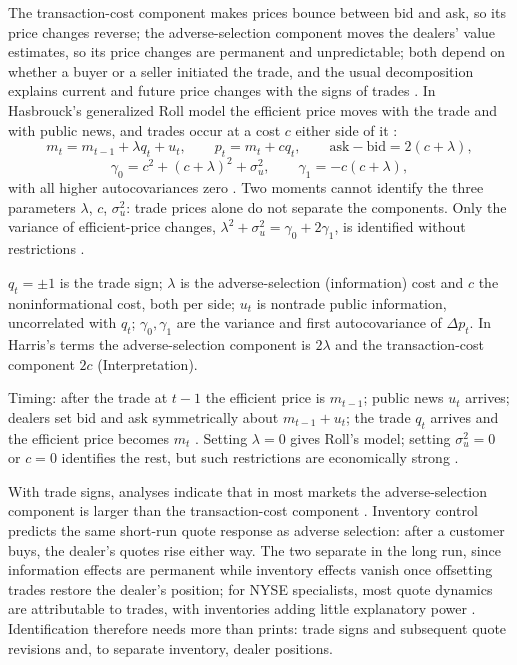 \begin{qfresult}\label{res:spread-component-identification}
 The transaction-cost component makes prices bounce between bid and ask, so its price changes reverse; the adverse-selection component moves the dealers' value estimates, so its price changes are permanent and unpredictable; both depend on whether a buyer or a seller initiated the trade, and the usual decomposition explains current and future price changes with the signs of trades \citep[chap.~``Bid/Ask Spreads'', pp.~299--300 and~302--303]{alpha-harris}. In Hasbrouck's generalized Roll model the efficient price moves with the trade and with public news, and trades occur at a cost $c$ either side of it \citep[sec.~8.2, eq.~(8.1), pp.~67--68]{s6-hasbrouck}:
\[ m_t=m_{t-1}+\lambda q_t+u_t, \qquad p_t=m_t+cq_t, \qquad \text{ask}-\text{bid}=2(c+\lambda), \]
\[ \gamma_0=c^2+(c+\lambda)^2+\sigma_u^2, \qquad \gamma_1=-c(c+\lambda), \]
with all higher autocovariances zero \citep[sec.~8.3, eq.~(8.3), p.~68]{s6-hasbrouck}. Two moments cannot identify the three parameters $\lambda$, $c$, $\sigma_u^2$: trade prices alone do not separate the components. Only the variance of efficient-price changes, $\lambda^2+\sigma_u^2=\gamma_0+2\gamma_1$, is identified without restrictions \citep[same sec., pp.~68--69]{s6-hasbrouck}.

 $q_t=\pm1$ is the trade sign; $\lambda$ is the adverse-selection (information) cost and $c$ the noninformational cost, both per side; $u_t$ is nontrade public information, uncorrelated with $q_t$; $\gamma_0,\gamma_1$ are the variance and first autocovariance of $\Delta p_t$. In Harris's terms the adverse-selection component is $2\lambda$ and the transaction-cost component $2c$ (Interpretation).

 Timing: after the trade at $t-1$ the efficient price is $m_{t-1}$; public news $u_t$ arrives; dealers set bid and ask symmetrically about $m_{t-1}+u_t$; the trade $q_t$ arrives and the efficient price becomes $m_t$ \citep[sec.~8.2, p.~68]{s6-hasbrouck}. Setting $\lambda=0$ gives Roll's model; setting $\sigma_u^2=0$ or $c=0$ identifies the rest, but such restrictions are economically strong \citep[sec.~8.3, p.~69]{s6-hasbrouck}.

 With trade signs, analyses indicate that in most markets the adverse-selection component is larger than the transaction-cost component \citep[chap.~``Bid/Ask Spreads'', p.~303]{alpha-harris}. Inventory control predicts the same short-run quote response as adverse selection: after a customer buys, the dealer's quotes rise either way. The two separate in the long run, since information effects are permanent while inventory effects vanish once offsetting trades restore the dealer's position; for NYSE specialists, most quote dynamics are attributable to trades, with inventories adding little explanatory power \citep[sec.~11.4, p.~115]{s6-hasbrouck}. Identification therefore needs more than prints: trade signs and subsequent quote revisions and, to separate inventory, dealer positions.


\end{qfresult}
